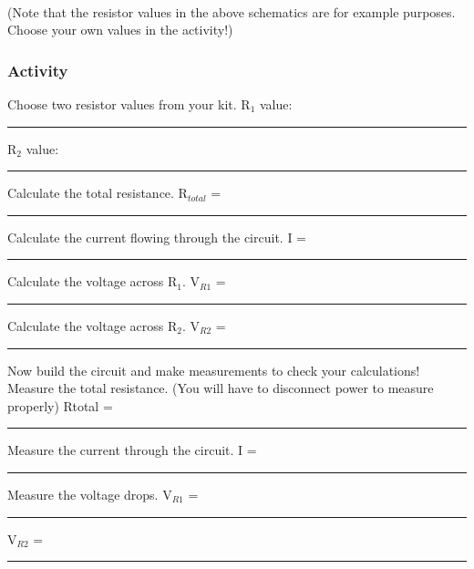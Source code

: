 \documentclass{article}
\begin{document}
\paragraph{}
(Note that the resistor values in the above schematics are for example purposes. Choose your own values in the activity!)

\subsubsection{Activity}
\noindent
Choose two resistor values from your kit. R$_1$ value: \rule{2cm}{0.15mm} R$_2$ value: \rule{2cm}{0.15mm}
\newline
\newline
Calculate the total resistance. R$_{total}$ = \rule{2cm}{0.15mm} 
\newline
\newline
Calculate the current flowing through the circuit. I = \rule{2cm}{0.15mm} 
\newline
\newline
Calculate the voltage across R$_1$. V$_{R1}$ = \rule{2cm}{0.15mm} 
\newline
\newline
Calculate the voltage across R$_2$. V$_{R2}$ = \rule{2cm}{0.15mm} 
\newline
\newline
\newline
\newline
Now build the circuit and make measurements to check your calculations!
\newline
\newline
Measure the total resistance. (You will have to disconnect power to measure properly) 
\newline
\newline
Rtotal = \rule{2cm}{0.15mm} 
\newline
\newline
Measure the current through the circuit. I = \rule{2cm}{0.15mm} 
\newline
\newline
Measure the voltage drops. V$_{R1}$ = \rule{2cm}{0.15mm} V$_{R2}$ = \rule{2cm}{0.15mm} 
\end{document}
